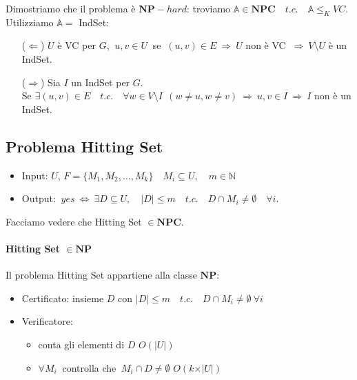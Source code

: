 \documentclass[a4paper]{article}
\theoremstyle{definition}
\newcommand{\N}{\mathbb{N}}
\newcommand{\np}{\mathbf{NP}}
\newcommand{\npc}{\mathbf{NPC}}
\newcommand{\prob}[1]{\mathbb{#1}}
\begin{document}
		
		Dimostriamo che il problema è $ \np-hard $: troviamo $ \prob{A}\in \npc\quad t.c.\quad \prob{A}\leq_K VC $.\\
		
		Utilizziamo $ \prob{A} = $ IndSet:
		\begin{itemize}
			\item[($ \Leftarrow $)] $ U $ è VC per $ G $, $ \ u, v \in U \ $ se $ \ (u,v)\in E\ \Rightarrow\ U $ non è VC
			$ \ \Rightarrow\ V\setminus U $ è un IndSet.
			\item[($ \Rightarrow $)] Sia $ I $ un IndSet per $ G $.\\
			Se $ \exists (u,v)\in E\quad t.c.\quad \forall w \in V\setminus I\ \ (w\neq u, w\neq v)\ \Rightarrow\ u, v\in I\ \Rightarrow\ I $ non è un IndSet.
		\end{itemize}
	
	\subsection{Problema Hitting Set}
		\begin{itemize}
			\item Input: $ U $, $ F = \{M_1, M_2, \dots, M_k\}\quad M_i\subseteq U,\quad m \in\N $
			\item Output: $ \ yes\ \Leftrightarrow\ \exists D\subseteq U, \quad \vert D\vert \leq m\quad t.c.\quad D\cap M_i \neq \emptyset\quad \forall i $.
		\end{itemize}
		Facciamo vedere che Hitting Set $ \in \npc $.
	
		\paragraph{Hitting Set $ \in \np $} Il problema Hitting Set appartiene alla classe $ \np $:
		\begin{itemize}
			\item Certificato: insieme $ D $ con $ \vert D \vert \leq m\quad t.c.\quad D\cap M_i \neq \emptyset\ \forall i $
			\item Verificatore: 
			\begin{itemize}
				\item conta gli elementi di $ D $ \hspace{2cm} $ O(\vert U \vert) $
				\item $ \forall M_i\  $ controlla che $ \ M_i\cap D \neq \emptyset $ \hspace{.7cm} $ O(k\times\vert U \vert) $
			\end{itemize}		
		\end{itemize}
		
\end{document}
